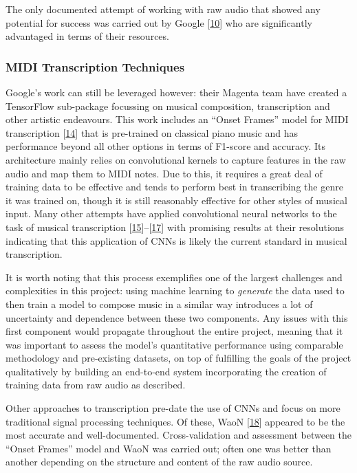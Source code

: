 \documentclass[12pt,]{article}
\begin{document}
The only documented attempt of working with raw audio that showed any
potential for success was carried out by Google
{[}\protect\hyperlink{ref-oord2016wavenet}{10}{]} who are significantly
advantaged in terms of their resources.

\hypertarget{midi-transcription-techniques}{%
\subsubsection{MIDI Transcription
Techniques}\label{midi-transcription-techniques}}

Google's work can still be leveraged however: their Magenta team have
created a TensorFlow sub-package focussing on musical composition,
transcription and other artistic endeavours. This work includes an
``Onset Frames'' model for MIDI transcription
{[}\protect\hyperlink{ref-hawthorne2017onsets}{14}{]} that is
pre-trained on classical piano music and has performance beyond all
other options in terms of F1-score and accuracy. Its architecture mainly
relies on convolutional kernels to capture features in the raw audio and
map them to MIDI notes. Due to this, it requires a great deal of
training data to be effective and tends to perform best in transcribing
the genre it was trained on, though it is still reasonably effective for
other styles of musical input. Many other attempts have applied
convolutional neural networks to the task of musical transcription
{[}\protect\hyperlink{ref-bereketai}{15}{]}--{[}\protect\hyperlink{ref-sarnatskyi2017music}{17}{]}
with promising results at their resolutions indicating that this
application of CNNs is likely the current standard in musical
transcription.

It is worth noting that this process exemplifies one of the largest
challenges and complexities in this project: using machine learning to
\emph{generate} the data used to then train a model to compose music in
a similar way introduces a lot of uncertainty and dependence between
these two components. Any issues with this first component would
propagate throughout the entire project, meaning that it was important
to assess the model's quantitative performance using comparable
methodology and pre-existing datasets, on top of fulfilling the goals of
the project qualitatively by building an end-to-end system incorporating
the creation of training data from raw audio as described.

Other approaches to transcription pre-date the use of CNNs and focus on
more traditional signal processing techniques. Of these, WaoN
{[}\protect\hyperlink{ref-waon}{18}{]} appeared to be the most accurate
and well-documented. Cross-validation and assessment between the ``Onset
Frames'' model and WaoN was carried out; often one was better than
another depending on the structure and content of the raw audio source.
\end{document}
